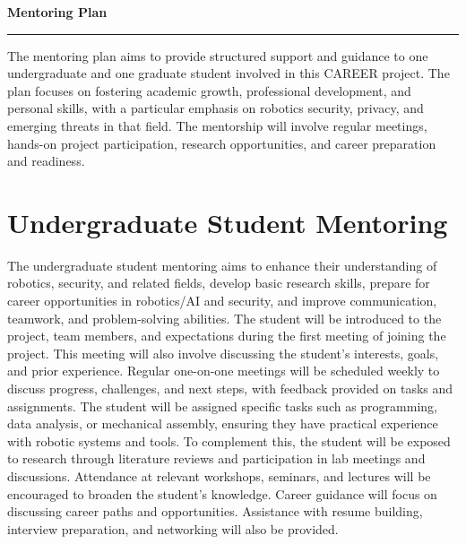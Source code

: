 \setcounter{section}{0}

{\Large\bfseries\filcenter
Mentoring Plan
\\\rule{\textwidth}{0.4pt}}

The mentoring plan aims to provide structured support and guidance to one undergraduate and one graduate student involved in this CAREER project. The plan focuses on fostering academic growth, professional development, and personal skills, with a particular emphasis on robotics security, privacy, and emerging threats in that field. The mentorship will involve regular meetings, hands-on project participation, research opportunities, and career preparation and readiness.

\section*{Undergraduate Student Mentoring}

The undergraduate student mentoring aims to enhance their understanding of robotics, security, and related fields, develop basic research skills, prepare for career opportunities in robotics/AI and security, and improve communication, teamwork, and problem-solving abilities.
The student will be introduced to the project, team members, and expectations during the first meeting of joining the project. 
This meeting will also involve discussing the student's interests, goals, and prior experience. Regular one-on-one meetings will be scheduled weekly to discuss progress, challenges, and next steps, with feedback provided on tasks and assignments.
The student will be assigned specific tasks such as programming, data analysis, or mechanical assembly, ensuring they have practical experience with robotic systems and tools. 
To complement this, the student will be exposed to research through literature reviews and participation in lab meetings and discussions.
Attendance at relevant workshops, seminars, and lectures will be encouraged to broaden the student's knowledge. 
Career guidance will focus on discussing career paths and opportunities.
Assistance with resume building, interview preparation, and networking will also be provided. 

